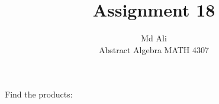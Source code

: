 \documentclass[12pt]{article}
\newenvironment{problem}[2][Problem]{\begin{trivlist}
\item[\hskip \labelsep {\bfseries #1}\hskip \labelsep {\bfseries #2.}]}{\end{trivlist}}
\begin{document}
 
 
\title{Assignment 18}%
\author{Md Ali\\ %
Abstract Algebra MATH 4307} %
 
\maketitle
 
\begin{problem}{3.1.1} %
Find the products:
\end{problem}
 
\end{document}
